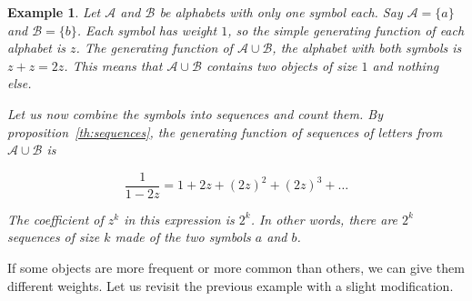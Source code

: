 \documentclass{article}
\newtheorem{example}{Example}
\begin{document}
\begin{example}
\label{ex:noweight}
Let $\mathcal{A}$ and $\mathcal{B}$ be alphabets with only one symbol
each. Say $\mathcal{A} = \{a\}$ and $\mathcal{B} = \{b\}$. Each symbol
has weight $1$, so the simple generating function of each alphabet is $z$.
The generating function of $\mathcal{A} \cup \mathcal{B}$, the alphabet
with both symbols is $z+z = 2z$. This means that $\mathcal{A} \cup
\mathcal{B}$ contains two objects of size $1$ and nothing else.

Let us now combine the symbols into sequences and count them. By
proposition~\ref{th:sequences}, the generating function of sequences of
letters from $\mathcal{A} \cup \mathcal{B}$ is

\begin{equation*}
\frac{1}{1-2z} = 1 + 2z + (2z)^2 + (2z)^3 + \ldots
\end{equation*}

The coefficient of $z^k$ in this expression is $2^k$. In other words,
there are $2^k$ sequences of size $k$ made of the two symbols $a$ and $b$.
\end{example}

If some objects are more frequent or more common than others, we can give
them different weights. Let us revisit the previous example with a slight
modification.
\end{document}
